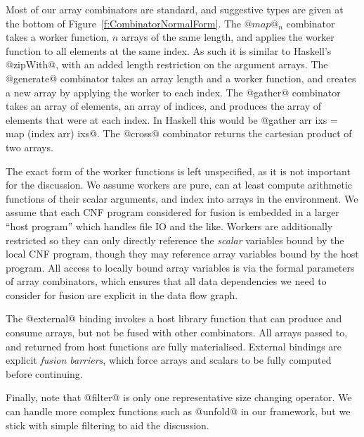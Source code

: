 Most of our array combinators are standard, and suggestive types are given at the bottom of Figure~\ref{f:CombinatorNormalForm}. The $@map@_n$ combinator takes a worker function, $n$ arrays of the same length, and applies the worker function to all elements at the same index. As such it is similar to Haskell's @zipWith@, with an added length restriction on the argument arrays. The @generate@ combinator takes an array length and a worker function, and creates a new array by applying the worker to each index. The @gather@ combinator takes an array of elements, an array of indices, and produces the array of elements that were at each index. In Haskell this would be @gather arr ixs = map (index arr) ixs@. The @cross@ combinator returns the cartesian product of two arrays. 

The exact form of the worker functions is left unspecified, as it is not important for the discussion. We assume workers are pure, can at least compute arithmetic functions of their scalar arguments, and index into arrays in the environment. We assume that each CNF program considered for fusion is embedded in a larger ``host program'' which handles file IO and the like. Workers are additionally restricted so they can only directly reference the \emph{scalar} variables bound by the local CNF program, though they may reference array variables bound by the host program. All access to locally bound array variables is via the formal parameters of array combinators, which ensures that all data dependencies we need to consider for fusion are explicit in the data flow graph.

The @external@ binding invokes a host library function that can produce and consume arrays, but not be fused with other combinators. All arrays passed to, and returned from host functions are fully materialised. External bindings are explicit \emph{fusion barriers}, which force arrays and scalars to be fully computed before continuing. 

Finally, note that @filter@ is only one representative size changing operator. We can handle more complex functions such as @unfold@ in our framework, but we stick with simple filtering to aid the discussion.




